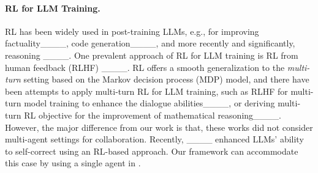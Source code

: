 \paragraph{RL for LLM Training. }
RL has been widely used in post-training  LLMs, e.g., for improving  factuality____, code generation____, and more recently and significantly, reasoning ____. One prevalent approach of RL for LLM training is RL from human feedback (RLHF) 
____. 
RL offers a smooth generalization to the {\it multi-turn} setting  based on the Markov decision process (MDP) model, and there have been attempts to apply multi-turn RL for LLM training, such as RLHF for multi-turn model training to enhance the dialogue abilities____, or deriving multi-turn RL objective for the improvement of mathematical reasoning____. However, the major difference from  our work is that, these works did not consider multi-agent settings for collaboration. Recently, ____ enhanced LLMs' ability to self-correct using an RL-based approach. Our framework can accommodate this case by using a single agent in  \ourstwo.